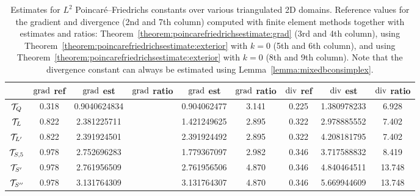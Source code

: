 \documentclass[10pt,a4paper]{article}
\begin{document}
\begin{table}[t]
    \centering
    \begin{tabular}{|c||c|c|c|c|c||c|c|c|}
        \hline
                        & $\operatorname{grad}$ ref  & $\operatorname{grad}$ est & $\operatorname{grad}$ ratio & $\operatorname{grad}$ est & $\operatorname{grad}$ ratio      & $\operatorname{div}$ ref  & $\operatorname{div}$ est  & $\operatorname{div}$ ratio \\ 
        \hline
        ${\mathcal T}_{Q}$     & 0.318        & 0.9040624834 &               & 0.904062477       & 3.141        & 0.225              & 1.380978233              &  6.928              \\ 
        \hline
        ${\mathcal T}_{L}$     & 0.822        & 2.381225711 &               & 1.421249625       & 2.895              & 0.322              & 2.978885552         &  7.402              \\ 
        \hline
        ${\mathcal T}_{L'}$     & 0.822        & 2.391924501 &               & 2.391924492       & 2.895              & 0.322              & 4.208181795        &  7.402              \\ 
        \hline
        ${\mathcal T}_{S,5}$     & 0.978        & 2.752696283 &               & 1.779367097       & 2.982              & 0.346              & 3.717588832       &  8.419              \\ 
        \hline %
        ${\mathcal T}_{S'}$    & 0.978        & 2.761956509 &               & 2.761956506       & 4.870              & 0.346              & 4.840464511         & 13.748              \\ 
        \hline %
        ${\mathcal T}_{S''}$   & 0.978        & 3.131764309 &               & 3.131764307       & 4.870              & 0.346              & 5.669944609         & 13.748              \\ 
        \hline
    \end{tabular}
    \caption{
    Estimates for $L^2$ Poincar\'e--Friedrichs constants over various triangulated 2D domains.
    Reference values for the gradient and divergence (2nd and 7th column) computed with finite element methods together with estimates and ratios: 
    Theorem~\ref{theorem:poincarefriedrichsestimate:grad} (3rd and 4th column), using Theorem~\ref{theorem:poincarefriedrichsestimate:exterior} with $k=0$ (5th and 6th column), 
    and using Theorem~\ref{theorem:poincarefriedrichsestimate:exterior} with $k=0$ (8th and 9th column).
    Note that the divergence constant can always be estimated using Lemma~\ref{lemma:mixedbconsimplex}.
    }\label{table:estimates2D}
\end{table}
\end{document}
